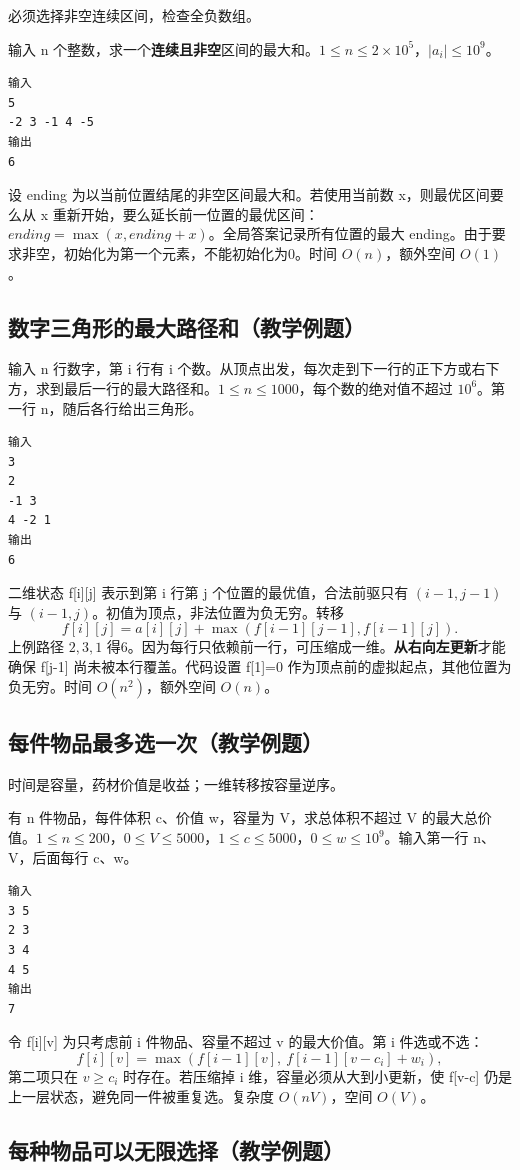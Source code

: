必须选择非空连续区间，检查全负数组。

输入 n 个整数，求一个\textbf{连续且非空}区间的最大和。$1\le n\le2\times10^5$，$|a_i|\le10^9$。
\begin{verbatim}
输入
5
-2 3 -1 4 -5
输出
6
\end{verbatim}
设 ending 为以当前位置结尾的非空区间最大和。若使用当前数 x，则最优区间要么从 x 重新开始，要么延长前一位置的最优区间：$ending=\max(x,ending+x)$。全局答案记录所有位置的最大 ending。由于要求非空，初始化为第一个元素，不能初始化为0。时间 $O(n)$，额外空间 $O(1)$。
\subsection{数字三角形的最大路径和（教学例题）}

输入 n 行数字，第 i 行有 i 个数。从顶点出发，每次走到下一行的正下方或右下方，求到最后一行的最大路径和。$1\le n\le1000$，每个数的绝对值不超过 $10^6$。第一行 n，随后各行给出三角形。
\begin{verbatim}
输入
3
2
-1 3
4 -2 1
输出
6
\end{verbatim}
二维状态 f[i][j] 表示到第 i 行第 j 个位置的最优值，合法前驱只有 $(i-1,j-1)$ 与 $(i-1,j)$。初值为顶点，非法位置为负无穷。转移
\[f[i][j]=a[i][j]+\max(f[i-1][j-1],f[i-1][j]).\]
上例路径 $2,3,1$ 得6。因为每行只依赖前一行，可压缩成一维。\textbf{从右向左更新}才能确保 f[j-1] 尚未被本行覆盖。代码设置 f[1]=0 作为顶点前的虚拟起点，其他位置为负无穷。时间 $O(n^2)$，额外空间 $O(n)$。
\subsection{每件物品最多选一次（教学例题）}

时间是容量，药材价值是收益；一维转移按容量逆序。

有 n 件物品，每件体积 c、价值 w，容量为 V，求总体积不超过 V 的最大总价值。$1\le n\le200$，$0\le V\le5000$，$1\le c\le5000$，$0\le w\le10^9$。输入第一行 n、V，后面每行 c、w。
\begin{verbatim}
输入
3 5
2 3
3 4
4 5
输出
7
\end{verbatim}
令 f[i][v] 为只考虑前 i 件物品、容量不超过 v 的最大价值。第 i 件选或不选：
\[f[i][v]=\max(f[i-1][v],\ f[i-1][v-c_i]+w_i),\]
第二项只在 $v\ge c_i$ 时存在。若压缩掉 i 维，容量必须从大到小更新，使 f[v-c] 仍是上一层状态，避免同一件被重复选。复杂度 $O(nV)$，空间 $O(V)$。
\subsection{每种物品可以无限选择（教学例题）}

